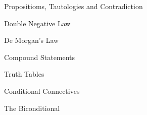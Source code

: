 Propositioms, Tautologies and Contradiction

Double Negative Law

De Morgan's Law

Compound Statements

Truth Tables


Conditional Connectives

The Biconditional

